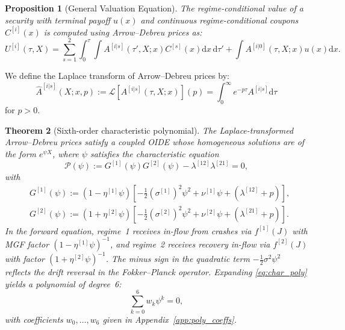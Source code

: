 \documentclass[11pt,a4paper]{article}
\numberwithin{equation}{section}
\newtheorem{theorem}{Theorem}[section]
\newtheorem{proposition}[theorem]{Proposition}
\newcommand{\Lp}{\mathcal{L}}
\newcommand{\dd}{\mathrm{d}}
\begin{document}
\begin{proposition}[General Valuation Equation]\label{prop:valuation}
The regime-conditional value of a security with terminal payoff $u(x)$ and continuous regime-conditional coupons $C^{[i]}(x)$ is computed using Arrow--Debreu prices as:
\begin{equation}\label{eq:valuation_formula}
U^{[i]}(\tau, X) = \sum_{s=1}^{2} \int_0^\tau \!\! \int A^{[i|s]}(\tau', X; x) C^{[s]}(x) \dd x \, \dd \tau' + \int A^{[i|0]}(\tau, X; x) u(x) \dd x.
\end{equation}
\end{proposition}


We define the Laplace transform of Arrow--Debreu prices by:
\begin{equation}\label{eq:valuation_formula_lp}
\hat{A}^{[i|s]}(X; x, p) := \Lp[A^{[i|s]}(\tau, X; x)](p) = \int_0^\infty e^{-p\tau} A^{[i|s]} \dd\tau
\end{equation}
for $p > 0$.

\begin{theorem}[Sixth-order characteristic polynomial]\label{thm:char_poly}
The Laplace-transformed Arrow--Debreu prices satisfy a coupled OIDE whose homogeneous solutions are of the form $e^{\psi X}$, where $\psi$ satisfies the characteristic equation
\begin{equation}\label{eq:char_poly}
\mathcal{P}(\psi) := G^{[1]}(\psi) G^{[2]}(\psi) - \lambda^{[12]} \lambda^{[21]} = 0,
\end{equation}
with
\begin{equation}\label{eq:G_def}
\begin{split}
& G^{[1]}(\psi) := (1 - \eta^{[1]} \psi) \left[-\tfrac{1}{2}(\sigma^{[1]})^2 \psi^2 + \nu^{[1]} \psi + (\lambda^{[12]} + p)\right], \\
& G^{[2]}(\psi) := (1 + \eta^{[2]} \psi) \left[-\tfrac{1}{2}(\sigma^{[2]})^2 \psi^2 + \nu^{[2]} \psi + (\lambda^{[21]} + p)\right].
\end{split}
\end{equation}
In the forward equation, regime~1 receives in-flow from crashes via $f^{[1]}(J)$ with MGF factor $(1-\eta^{[1]}\psi)^{-1}$, and regime~2 receives recovery in-flow via $f^{[2]}(J)$ with factor $(1+\eta^{[2]}\psi)^{-1}$. The minus sign in the quadratic term $-\tfrac{1}{2}\sigma^2\psi^2$ reflects the drift reversal in the Fokker--Planck operator. Expanding \eqref{eq:char_poly} yields a polynomial of degree~6:
\begin{equation}\label{eq:poly6}
\sum_{k=0}^{6} w_k \psi^k = 0,
\end{equation}
with coefficients $w_0, \ldots, w_6$ given in Appendix~\ref{app:poly_coeffs}.
\end{theorem}
\end{document}
